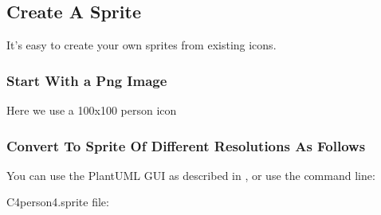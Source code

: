 \documentclass[letterpaper,10pt,english]{sphinxmanual}
\begin{document}
\subsection{Create A Sprite}
\label{\detokenize{PlantUMLSpriteLibraries/plantuml_sprites:create-a-sprite}}
It’s easy to create your own sprites from existing icons.


\subsubsection{Start With a Png Image}
\label{\detokenize{PlantUMLSpriteLibraries/plantuml_sprites:start-with-a-png-image}}
Here we use a 100x100 person icon

\begin{figure}[htbp]
\centering

\noindent{}
\end{figure}


\subsubsection{Convert To Sprite Of Different Resolutions As Follows}
\label{\detokenize{PlantUMLSpriteLibraries/plantuml_sprites:convert-to-sprite-of-different-resolutions-as-follows}}
You can use the PlantUML GUI as described in , or use the command line:

\begin{sphinxVerbatim}[commandchars=\\\{\}]
       
       
       
\end{sphinxVerbatim}

C4person4.sprite file:
\end{document}
